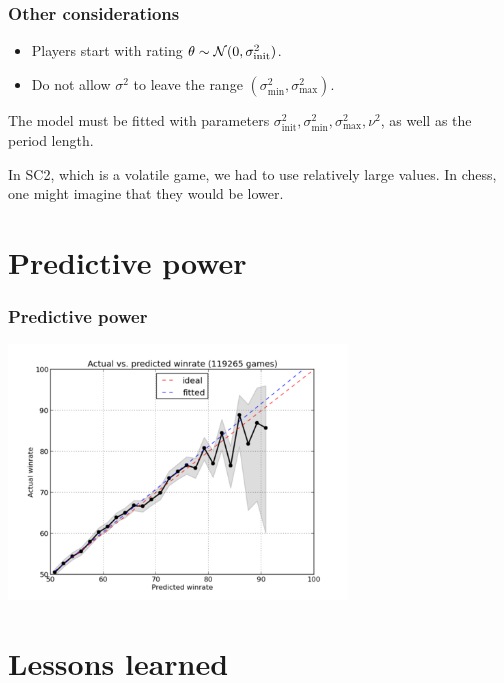 \documentclass[color={usenames,dvipsnames}]{beamer}
\begin{document}
\begin{frame}
  \frametitle{Other considerations}

  \begin{itemize}
  \item Players start with rating $\theta \sim \mathcal{N}(0,\sigma^2_{\text{init}})$.
  \item Do not allow $\sigma^2$ to leave the range
    $\left(\sigma^2_{\text{min}}, \sigma^2_{\text{max}}\right)$.
  \end{itemize}

  The model must be fitted with parameters 
  $\sigma^2_{\text{init}}, \sigma^2_{\text{min}}, \sigma^2_{\text{max}}, \nu^2$,
  as well as the period length.
  
  In SC2, which is a volatile game, we had to use relatively large values. In
  chess, one might imagine that they would be lower.
\end{frame}

\section{Predictive power}

\begin{frame}
  \frametitle{Predictive power}

  \begin{center}
    \includegraphics[width=9cm]{figs/predict}
  \end{center}
\end{frame}

\section{Lessons learned}
\end{document}
